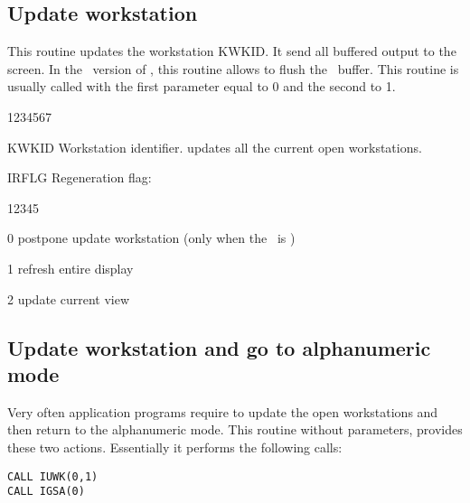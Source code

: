 \subsection{Update workstation}
\Action
This routine updates the workstation KWKID. It send all buffered output to the
screen. In the ~version of \HIGZ, this routine allows to flush the
~buffer. This routine is usually called with the first parameter equal to
0 and the second to 1.
\Pdesc
\begin{DLtt}{1234567}
\item[KWKID] Workstation identifier.
              updates all the current open workstations.
\item[IRFLG] Regeneration flag:
\begin{DLtt}{12345}
\item[0] postpone update workstation (only when the \UGP~is \GKS)
\item[1] refresh entire display
\item[2] update current view
\end{DLtt}
\end{DLtt}
%
\newpage
\subsection{Update workstation and go to alphanumeric mode}
\Action
Very often application programs require to update the open workstations and
then return to the alphanumeric mode. This routine without parameters,
provides these two actions. Essentially it performs the following calls:
\begin{verbatim}
CALL IUWK(0,1)
CALL IGSA(0)
\end{verbatim}
%
